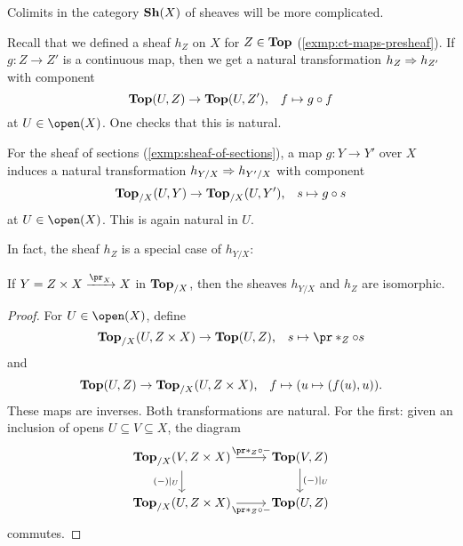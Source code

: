 \begin{rmk}
Colimits in the category $\operatorname{\mathbf{Sh}}(X)$ of sheaves will be more complicated.
\end{rmk}

\begin{exmp}
Recall that we defined a sheaf $h_Z$ on $X$ for $Z\in\mathbf{Top}$ (\cref{exmp:ct-maps-presheaf}).
If $g\colon Z\to Z'$ is a continuous map, then we get a natural transformation $h_Z\Rightarrow h_{Z'}$ with component
\[ \cont(U,Z) \to \cont(U,Z')\text{,} \quad f \mapsto g\circ f \]
at $U\in\open(X)$.
One checks that this is natural.
\end{exmp}

\begin{exmp}
For the sheaf of sections (\cref{exmp:sheaf-of-sections}), a map $g\colon Y\to Y'$ over $X$ induces a natural transformation $h_{Y/X}\Rightarrow h_{Y'/X}$ with component
\[ \cont[X](U,Y) \to \cont[X](U,Y')\text{,} \quad s \mapsto g\circ s \]
at $U\in\open(X)$.
This is again natural in $U$.
\end{exmp}

In fact, the sheaf $h_Z$ is a special case of $h_{Y/X}$:

\begin{lem}
If $Y=Z\times X\xrightarrow{\pr_X} X$ in $\mathbf{Top}_{/X}$, then the sheaves $h_{Y/X}$ and $h_Z$ are isomorphic.
\end{lem}
\begin{proof}
For $U\in\open(X)$, define
\[ \cont[X](U,Z\times X) \to \cont(U,Z)\text{,} \quad s\mapsto \pr*_Z\circ s \]
and
\[ \cont(U,Z) \to \cont[X](U,Z\times X)\text{,} \quad f \mapsto (u\mapsto (f(u),u))\text{.} \]
These maps are inverses.
Both transformations are natural. For the first: given an inclusion of opens $U\subseteq V\subseteq X$, the diagram
\begin{equation*}
    \begin{tikzcd}
        \cont[X](V,Z\times X) \ar[r, "\pr*_Z\circ -"] \ar[d, "(-)|_U"'] & \cont(V,Z) \ar[d, "(-)|_U"] \\
        \cont[X](U,Z\times X) \ar[r, "\pr*_Z\circ -"'] & \cont(U,Z)
    \end{tikzcd}
\end{equation*}
commutes.
\end{proof}

